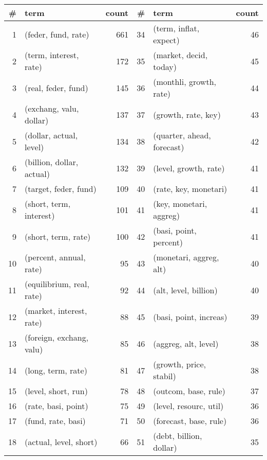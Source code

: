 \begin{tabular}{rlrrlr}
\toprule
  \# &                        term &  count &   \# &                          term &  count \\
\midrule
  1 &         (feder, fund, rate) &    661 &  34 &        (term, inflat, expect) &     46 \\
  2 &      (term, interest, rate) &    172 &  35 &        (market, decid, today) &     45 \\
  3 &         (real, feder, fund) &    145 &  36 &       (monthli, growth, rate) &     44 \\
  4 &     (exchang, valu, dollar) &    137 &  37 &           (growth, rate, key) &     43 \\
  5 &     (dollar, actual, level) &    134 &  38 &    (quarter, ahead, forecast) &     42 \\
  6 &   (billion, dollar, actual) &    132 &  39 &         (level, growth, rate) &     41 \\
  7 &       (target, feder, fund) &    109 &  40 &         (rate, key, monetari) &     41 \\
  8 &     (short, term, interest) &    101 &  41 &       (key, monetari, aggreg) &     41 \\
  9 &         (short, term, rate) &    100 &  42 &        (basi, point, percent) &     41 \\
 10 &     (percent, annual, rate) &     95 &  43 &       (monetari, aggreg, alt) &     40 \\
 11 &   (equilibrium, real, rate) &     92 &  44 &         (alt, level, billion) &     40 \\
 12 &    (market, interest, rate) &     88 &  45 &        (basi, point, increas) &     39 \\
 13 &    (foreign, exchang, valu) &     85 &  46 &          (aggreg, alt, level) &     38 \\
 14 &          (long, term, rate) &     81 &  47 &       (growth, price, stabil) &     38 \\
 15 &         (level, short, run) &     78 &  48 &          (outcom, base, rule) &     37 \\
 16 &         (rate, basi, point) &     75 &  49 &        (level, resourc, util) &     36 \\
 17 &          (fund, rate, basi) &     71 &  50 &        (forecast, base, rule) &     36 \\
 18 &      (actual, level, short) &     66 &  51 &       (debt, billion, dollar) &     35 \\

\end{tabular}
